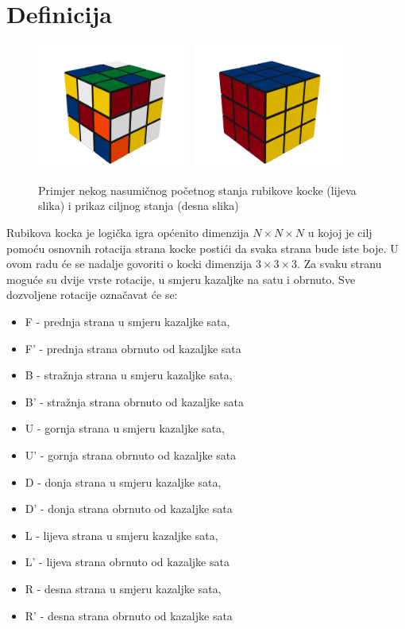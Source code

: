 \documentclass[times, utf8, seminar, numeric]{fer}
\begin{document}
\section{Definicija}


\begin{figure}[h]
\centering
\includegraphics[width=0.45\textwidth]{image/rubik_cube_scrambled.png}
\includegraphics[width=0.45\textwidth]{image/rubik_cube_solved.png}
\caption{Primjer nekog nasumičnog početnog stanja rubikove kocke (lijeva slika) i prikaz ciljnog stanja (desna slika) }
\end{figure}

Rubikova kocka je logička igra općenito dimenzija $N\times N\times N$ u kojoj je cilj pomoću osnovnih rotacija strana kocke postići da svaka strana bude iste boje. U ovom radu će se nadalje govoriti o kocki dimenzija $3\times3\times3$. Za svaku stranu moguće su dvije vrste rotacije, u smjeru kazaljke na satu i obrnuto. Sve dozvoljene rotacije označavat će se:

\begin{itemize}
\item F - prednja strana u smjeru kazaljke sata, 
\item F' - prednja strana obrnuto od kazaljke sata
\item B - stražnja strana u smjeru kazaljke sata, 
\item B' - stražnja strana obrnuto od kazaljke sata
\item U - gornja strana u smjeru kazaljke sata, 
\item U' - gornja strana obrnuto od kazaljke sata
\item D - donja strana u smjeru kazaljke sata, 
\item D' - donja strana obrnuto od kazaljke sata
\item L - lijeva strana u smjeru kazaljke sata, 
\item L' - lijeva strana obrnuto od kazaljke sata
\item R - desna strana u smjeru kazaljke sata, 
\item R' - desna strana obrnuto od kazaljke sata
\end{itemize}
\end{document}
